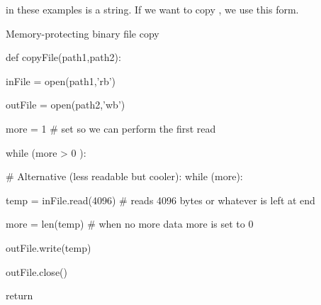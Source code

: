  in these examples is a string.  If we want to copy , we use this form.



\begin{recipe}{Memory-protecting binary file copy}

\begin{example}

def copyFile(path1,path2):



  inFile  = open(path1,'rb')

  outFile = open(path2,'wb')



  more = 1                    # set so we can perform the first read

  while (more > 0 ):

                      # Alternative (less readable but cooler): while (more):



    temp = inFile.read(4096)  # reads 4096 bytes or whatever is left at end

    more = len(temp)          # when no more data more is set to 0

    outFile.write(temp)



  outFile.close()

  return

\end{example}

\end{recipe}

